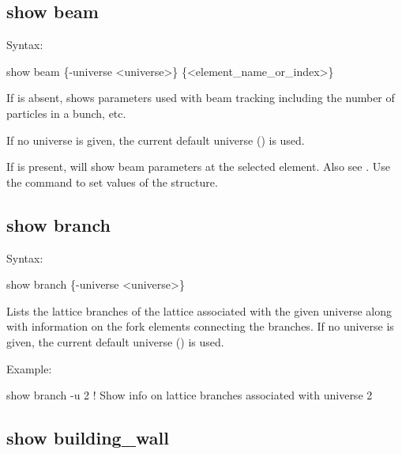 {{{{{{{{%

\subsection{show beam}
\label{s:show.beam}

Syntax:
\begin{example}
  show beam \{-universe <universe>\} \{<element_name_or_index>\}
\end{example}

If  is absent,  shows parameters used with beam tracking
including the number of particles in a bunch, etc. 

If no universe is given, the current default universe () is used.

If  is present,  will show beam parameters at the selected
element. Also see .  Use the  command to set values of the
 structure.


\subsection{show branch}
\label{s:show.branch}

Syntax:
\begin{example}
  show branch \{-universe <universe>\}
\end{example}

Lists the lattice branches of the lattice associated with the given universe along with information
on the fork elements connecting the branches.  If no universe is given, the current default universe
() is used.

Example:
\begin{example}
  show branch -u 2     ! Show info on lattice branches associated with universe 2
\end{example}


\subsection{show building_wall}
\label{s:show.building}

}}}}}}}}
